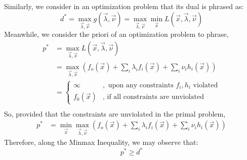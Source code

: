 Similarly, we consider in an optimization problem that its dual is phrased as:
\[
    d^* = \max_{\vec{\lambda}, \vec{\nu}} g(\vec{\lambda}, \vec{\nu}) = \max_{\vec{\lambda}, \vec{\nu}} \min_{\vec{x}} L(\vec{x}, \vec{\lambda}, \vec{\nu})
\]
Meanwhile, we consider the priori of an optimization problem to phrase,
\begin{align*}
    p^* &= \max_{\vec{\lambda}, \vec{\nu}} L(\vec{x}, \vec{\lambda}, \vec{\nu}) \\
    &= \max_{\vec{\lambda}, \vec{\nu}} (f_o(\vec{x}) + \sum_i \lambda_i f_i(\vec{x}) + \sum_i \nu_i h_i (\vec{x})) \\
    &= \begin{cases}
        \infty &,\text{ upon any constraints $f_i, h_i$ violated} \\
        f_0(\vec{x}) &,\text{ if all constraints are unviolated}
    \end{cases} \\
\end{align*}
So, provided that the constraints are unviolated in the primal problem,
\begin{align*}
    p^* &= \min_{\vec{x}} \max_{\vec{\lambda}, \vec{\nu}} (f_o(\vec{x}) + \sum_i \lambda_i f_i(\vec{x}) + \sum_i \nu_i h_i (\vec{x}))
\end{align*}
Therefore, along the Minmax Inequality, we may observe that:
\[
    p^* \geq d^*
\]
